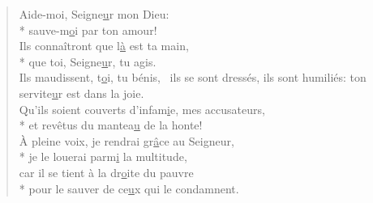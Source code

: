 \begin{verse}
Aide-moi, Seigne\underline{u}r mon Dieu: \\*
sauve-m\underline{o}i par ton amour! \\
Ils connaîtront que l\underline{à} est ta main, \\*
que toi, Seigne\underline{u}r, tu agis. \\

Ils maudissent, t\underline{o}i, tu bénis,~\psalmstar
ils se sont dressés, ils sont humiliés:
ton servite\underline{u}r est dans la joie. \\
Qu’ils soient couverts d’infam\underline{i}e, mes accusateurs, \\*
et revêtus du mantea\underline{u} de la honte! \\

À pleine voix, je rendrai gr\underline{â}ce au Seigneur, \\*
je le louerai parm\underline{i} la multitude, \\
car il se tient à la dr\underline{o}ite du pauvre \\*
pour le sauver de ce\underline{u}x qui le condamnent. \\
\end{verse}

